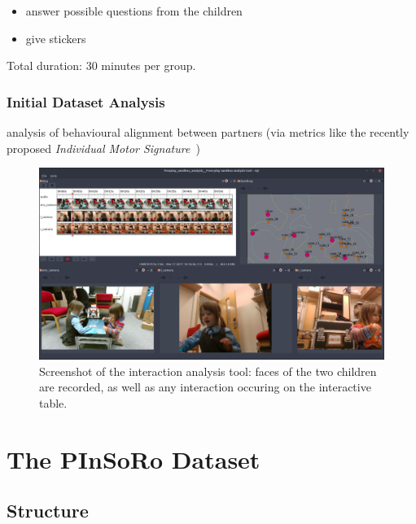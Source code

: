 \documentclass{article}
\begin{document}
\begin{enumerate}
  \begin{itemize}
  \item
    answer possible questions from the children
  \item
    give stickers
  \end{itemize}
\end{enumerate}


Total duration: 30 minutes per group.

\subsubsection{Initial Dataset Analysis}

analysis of behavioural alignment between partners (via
metrics like the recently proposed \emph{Individual Motor
Signature}~\cite{slowinski2016dynamic})

\begin{figure}
    \centering
    \includegraphics[width=\linewidth]{analysis}
    \caption{Screenshot of the interaction analysis tool: faces of the two
    children are recorded, as well as any interaction occuring on the
    interactive table.}
    \label{fig|analysis}
\end{figure}

\section{The PInSoRo Dataset}

\subsection{Structure}
\end{document}
